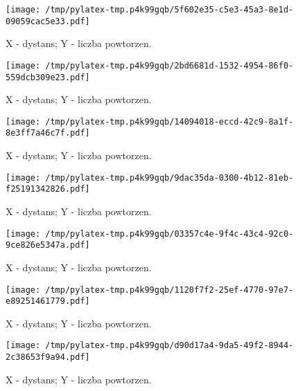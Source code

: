 \documentclass{article}%
\begin{document}
%
\newpage%


\begin{figure}[h]%
\centering%
\texttt{[image: /tmp/pylatex-tmp.p4k99gqb/5f602e35-c5e3-45a3-8e1d-09059cac5e33.pdf]}%
\caption{X {-} dystans; Y {-} liczba powtorzen.}%
\end{figure}

%
\newpage%


\begin{figure}[h]%
\centering%
\texttt{[image: /tmp/pylatex-tmp.p4k99gqb/2bd6681d-1532-4954-86f0-559dcb309e23.pdf]}%
\caption{X {-} dystans; Y {-} liczba powtorzen.}%
\end{figure}

%
\newpage%


\begin{figure}[h]%
\centering%
\texttt{[image: /tmp/pylatex-tmp.p4k99gqb/14094018-eccd-42c9-8a1f-8e3ff7a46c7f.pdf]}%
\caption{X {-} dystans; Y {-} liczba powtorzen.}%
\end{figure}

%
\newpage%


\begin{figure}[h]%
\centering%
\texttt{[image: /tmp/pylatex-tmp.p4k99gqb/9dac35da-0300-4b12-81eb-f25191342826.pdf]}%
\caption{X {-} dystans; Y {-} liczba powtorzen.}%
\end{figure}

%
\newpage%


\begin{figure}[h]%
\centering%
\texttt{[image: /tmp/pylatex-tmp.p4k99gqb/03357c4e-9f4c-43c4-92c0-9ce826e5347a.pdf]}%
\caption{X {-} dystans; Y {-} liczba powtorzen.}%
\end{figure}

%
\newpage%


\begin{figure}[h]%
\centering%
\texttt{[image: /tmp/pylatex-tmp.p4k99gqb/1120f7f2-25ef-4770-97e7-e89251461779.pdf]}%
\caption{X {-} dystans; Y {-} liczba powtorzen.}%
\end{figure}

%
\newpage%


\begin{figure}[h]%
\centering%
\texttt{[image: /tmp/pylatex-tmp.p4k99gqb/d90d17a4-9da5-49f2-8944-2c38653f9a94.pdf]}%
\caption{X {-} dystans; Y {-} liczba powtorzen.}%
\end{figure}
\end{document}
